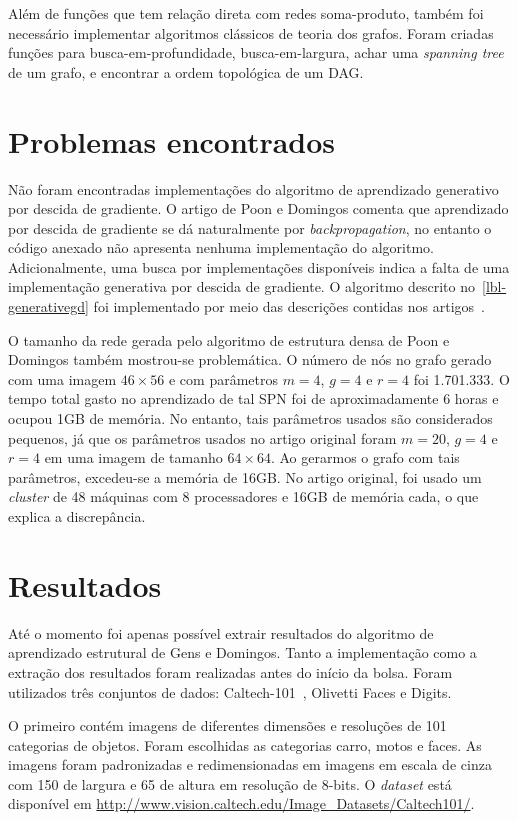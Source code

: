 \documentclass[12pt]{article}
\theoremstyle{plain}
\numberwithin{equation}{section}
\begin{document}
Além de funções que tem relação direta com redes soma-produto, também foi necessário implementar
algoritmos clássicos de teoria dos grafos. Foram criadas funções para busca-em-profundidade,
busca-em-largura, achar uma \textit{spanning tree} de um grafo, e encontrar a ordem topológica de
um DAG\@.

\section{Problemas encontrados}

Não foram encontradas implementações do algoritmo de aprendizado generativo por descida de
gradiente. O artigo de Poon e Domingos comenta que aprendizado por descida de gradiente se dá
naturalmente por \textit{backpropagation}\cite{poon-domingos}, no entanto o código anexado não
apresenta nenhuma implementação do algoritmo. Adicionalmente, uma busca por implementações
disponíveis indica a falta de uma implementação generativa por descida de gradiente. O algoritmo
descrito no~\autoref{lbl-generativegd} foi implementado por meio das descrições contidas
nos artigos~\cite{poon-domingos,discriminative}.

O tamanho da rede gerada pelo algoritmo de estrutura densa de Poon e Domingos também mostrou-se
problemática. O número de nós no grafo gerado com uma imagem $46\times 56$ e com parâmetros $m=4$,
$g=4$ e $r=4$ foi 1.701.333. O tempo total gasto no aprendizado de tal SPN foi de aproximadamente 6
horas e ocupou 1GB de memória. No entanto, tais parâmetros usados são considerados pequenos, já que
os parâmetros usados no artigo original foram $m=20$, $g=4$ e $r=4$ em uma imagem de tamanho
$64\times 64$. Ao gerarmos o grafo com tais parâmetros, excedeu-se a memória de 16GB\@. No artigo
original, foi usado um \textit{cluster} de 48 máquinas com 8 processadores e 16GB de memória cada,
o que explica a discrepância.

\section{Resultados}

Até o momento foi apenas possível extrair resultados do algoritmo de aprendizado estrutural de Gens
e Domingos. Tanto a implementação como a extração dos resultados foram realizadas antes do início
da bolsa. Foram utilizados três conjuntos de dados: Caltech-101~\cite{caltech101}, Olivetti Faces e
Digits.

O primeiro contém imagens de diferentes dimensões e resoluções de 101 categorias de
objetos. Foram escolhidas as categorias carro, motos e faces. As imagens foram padronizadas e
redimensionadas em imagens em escala de cinza com 150 de largura e 65 de altura em resolução de
8-bits. O \textit{dataset} está disponível em
\url{http://www.vision.caltech.edu/Image_Datasets/Caltech101/}.
\end{document}
